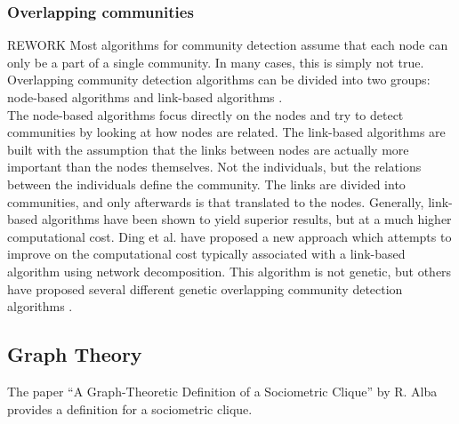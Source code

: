 \subsubsection{Overlapping communities}
REWORK
Most algorithms for community detection assume that each node can only be a part of a single community. 
In many cases, this is simply not true. 
Overlapping community detection algorithms can be divided into two groups: node-based algorithms and link-based algorithms \cite{linkclus2013}.\\

The node-based algorithms focus directly on the nodes and try to detect communities by looking at how nodes are related. The link-based algorithms are built with the assumption that the links between nodes are actually more important than the nodes themselves. Not the individuals, but the relations between the individuals define the community. The links are divided into communities, and only afterwards is that translated to the nodes. Generally, link-based algorithms have been shown to yield superior results, but at a much higher computational cost. Ding et al. \cite{Ding2016} have proposed a new approach which attempts to improve on the computational cost typically associated with a link-based algorithm using network decomposition. This algorithm is not genetic,  but others have proposed several different genetic overlapping community detection algorithms \cite{linkclus2013, Pizzuti2009, Dickinson2013}.\\

\subsection{Graph Theory}

The paper ``A Graph-Theoretic Definition of a Sociometric Clique'' by R. Alba provides a definition for a sociometric clique.
